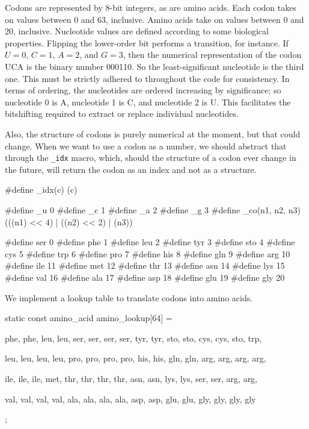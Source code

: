 \documentclass{article}
\begin{document}
      Codons are represented by 8-bit integers, as are amino acids. Each codon
      takes on values between 0 and 63, inclusive. Amino acids take on values
      between 0 and 20, inclusive. Nucleotide values are defined according to
      some biological properties. Flipping the lower-order bit performs a
      transition, for instance. If $U = 0$, $C = 1$, $A = 2$, and $G = 3$, then
      the numerical representation of the codon UCA is the binary number 000110.
      So the least-significant nucleotide is the third one. This must be
      strictly adhered to throughout the code for consistency. In terms of
      ordering, the nucleotides are ordered increasing by significance; so
      nucleotide 0 is A, nucleotide 1 is C, and nucleotide 2 is U. This
      facilitates the bitshifting required to extract or replace individual
      nucleotides.
      
      Also, the structure of codons is purely numerical at the moment, but that
      could change. When we want to use a codon as a number, we should abstract
      that through the \verb|_idx| macro, which, should the structure of a codon
      ever change in the future, will return the codon as an index and not as a
      structure.

\begin{ccode}
#define _idx(c) (c)

#define _u 0
#define _c 1
#define _a 2
#define _g 3
#define _co(n1, n2, n3) (((n1) << 4) | ((n2) << 2) | (n3))

#define ser 0
#define phe 1
#define leu 2
#define tyr 3
#define sto 4
#define cys 5
#define trp 6
#define pro 7
#define his 8
#define gln 9
#define arg 10
#define ile 11
#define met 12
#define thr 13
#define asn 14
#define lys 15
#define val 16
#define ala 17
#define asp 18
#define glu 19
#define gly 20
\end{ccode}

      We implement a lookup table to translate codons into amino acids.

\begin{ccode}
static const amino_acid amino_lookup[64] = {
    phe, phe, leu, leu,
    ser, ser, ser, ser,
    tyr, tyr, sto, sto,
    cys, cys, sto, trp,

    leu, leu, leu, leu,
    pro, pro, pro, pro,
    his, his, gln, gln,
    arg, arg, arg, arg,

    ile, ile, ile, met,
    thr, thr, thr, thr,
    asn, asn, lys, lys,
    ser, ser, arg, arg,

    val, val, val, val,
    ala, ala, ala, ala,
    asp, asp, glu, glu,
    gly, gly, gly, gly};
\end{ccode}
\end{document}
